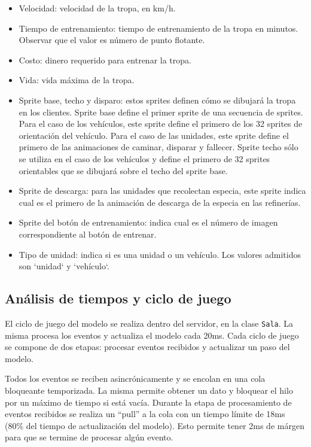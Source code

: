 \documentclass[titlepage,a4paper,12pt]{article}
\begin{document}
\begin{itemize}
\begin{itemize}
\item Velocidad: velocidad de la tropa, en km/h.

\item Tiempo de entrenamiento: tiempo de entrenamiento de la tropa en minutos. Observar que el valor es número de punto flotante.

\item Costo: dinero requerido para entrenar la tropa.

\item Vida: vida máxima de la tropa.

\item Sprite base, techo y disparo: estos sprites definen cómo se dibujará la tropa en los clientes.  Sprite base define el primer sprite de una secuencia de sprites. Para el caso de los vehículos, este sprite define el primero de los 32 sprites de orientación del vehículo. Para el caso de las unidades, este sprite define el primero de las animaciones de caminar, disparar y fallecer.  Sprite techo sólo se utiliza en el caso de los vehículos y define el primero de 32 sprites orientables que se dibujará sobre el techo del sprite base.

\item Sprite de descarga: para las unidades que recolectan especia, este sprite indica cual es el primero de la animación de descarga de la especia en las refinerías.

\item Sprite del botón de entrenamiento: indica cual es el número de imagen correspondiente al botón de entrenar.

\item Tipo de unidad: indica si es una unidad o un vehículo. Los valores admitidos son `unidad` y `vehículo`.

\end{itemize}

\end{itemize}


\subsection{Análisis de tiempos y ciclo de juego}
El ciclo de juego del modelo se realiza dentro del servidor, en la clase \texttt{Sala}. La misma procesa los eventos y actualiza el modelo cada 20ms. Cada ciclo de juego se compone de dos etapas: procesar eventos recibidos y actualizar un paso del modelo.

Todos los eventos se reciben asincrónicamente y se encolan en una cola bloqueante temporizada. La misma permite obtener un dato y bloquear el hilo por un máximo de tiempo si está vacía. Durante la etapa de procesamiento de eventos recibidos se realiza un ``pull'' a la cola con un tiempo límite de 18ms (80\% del tiempo de actualización del modelo). Esto permite tener 2ms de márgen para que se termine de procesar algún evento.
\end{document}
